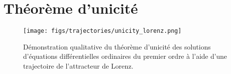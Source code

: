 \section{Théorème d'unicité} \label{sec: annexe_uniqueness}
    \begin{figure}[h!]
        \centering
        \texttt{[image: figs/trajectories/unicity\_lorenz.png]}
        \caption{Démonstration qualitative du théorème d'unicité des solutions d'équations différentielles ordinaires du premier ordre à l'aide d'une trajectoire de l'attracteur de Lorenz.}
        \label{fig: lorenz_uniqueness}
    \end{figure}
